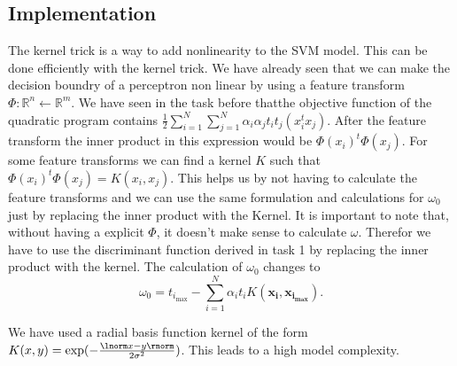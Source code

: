 \subsection{Implementation}
The kernel trick is a way to add nonlinearity to the SVM model. This can be done efficiently with the kernel trick. We have already seen that we can make the decision boundry of a perceptron non linear by using a feature transform $\Phi: \mathbb{R}^n \leftarrow \mathbb{R}^m$. We have seen in the task before thatthe objective function of the quadratic program contains $ \frac{1}{2} \sum\limits_{i=1}^N \sum\limits_{j=1}^N\alpha_i\alpha_jt_it_j(x_i^tx_j)$. After the feature transform the inner product in this expression would be $\Phi(x_i)^t\Phi(x_j)$. For some feature transforms we can find a kernel $K$ such that $\Phi(x_i)^t\Phi(x_j)=K(x_i,x_j)$. This helps us by not having to calculate the feature transforms and we can use the same formulation and calculations for $\omega_0$ just by replacing the inner product with the Kernel. It is important to note that, without having a explicit $\Phi$, it doesn't make sense to calculate $\omega$. Therefor we have to use the discriminant function derived in task 1 by replacing the inner product with the kernel. The calculation of $\omega_0$ changes to 
\[
	\omega_0 = t_{i_{\max}} -  \sum\limits_{i=1}^N\alpha_i t_i K(\bm{x_i},\bm{x_{i_{\max}}}).
\]

We have used a radial basis function kernel of the form $K(x,y) = \exp(-\frac{\lnorm x-y \rnorm}{2\sigma^2})$. This leads to a high model complexity.


